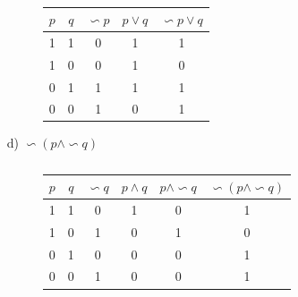 \documentclass[10pt]{article}
\begin{document}
\begin{ej}
\begin{itemize}
\begin{figure}[H]
\begin{minipage}[b]{0.4\linewidth}
			\end{minipage}	 	
			\begin{minipage}[b]{0.6\linewidth}
			\begin{table}[H]
			\begin{center}
				\begin{tabular}{|c|c|c|c|c|}
					\hline
					$p$ & $q$  & $\backsim p$ & $ p \lor q$  & $\backsim p \lor q$\\ \hline 
					  1    &   1    &             0            &         1           &              1                      \\ \hline
					  1    &   0    &             0            &         1           &              0                       \\ \hline
					  0    &   1    &             1            &         1           &              1                        \\ \hline
					  0    &   0    &             1            &         0           &              1                         \\ \hline
				\end{tabular}
				\caption{}
		\end{center}
	\end{table}	 			
			\end{minipage}
		\end{figure}					
			
 		\item [d)]  $\backsim (p \land \backsim q)$
			\begin{figure}[H]
	  		\begin{minipage}[b]{0.6\linewidth}
				\begin{table}[H]
			\begin{center}
				\begin{tabular}{|c|c|c|c|c|c|}
					\hline
$p$ & $q$  &  $\backsim q$ & $ p \land q$  &  $p \land \backsim q$ & $\backsim (p \land \backsim q)$\\\hline 
 1    &   1     &             0              &         1           &              0                            &          1              \\ \hline
 1    &   0     &             1              &         0           &              1                            &          0              \\ \hline
 0    &   1     &             0              &         0           &              0                            &          1              \\ \hline
 0    &   0     &             1              &         0           &              0                            &          1              \\ \hline
				\end{tabular}
				\caption{}
		\end{center}
	\end{table}	
			\end{minipage}	 	
			\begin{minipage}[b]{0.4\linewidth}	
			

\end{minipage}
\end{figure}
\end{itemize}
\end{ej}
\end{document}

